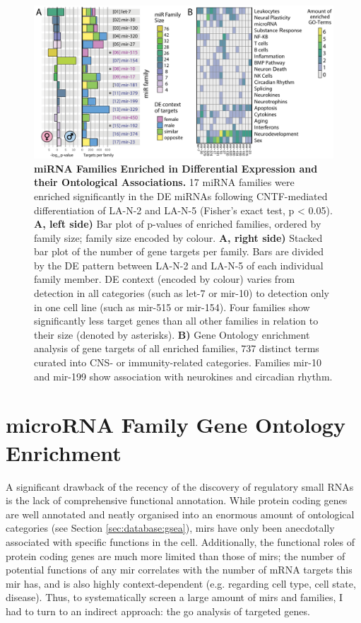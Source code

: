 \begin{figure}
\centering
\includegraphics[width=\textwidth]{figures/mir-de-fam-go}
\caption[Differential Expression miRNA Family Enrichment]{\textbf{miRNA Families Enriched in Differential Expression and their Ontological Associations.} 17 miRNA families were enriched significantly in the DE miRNAs following CNTF-mediated differentiation of LA-N-2 and LA-N-5 (Fisher's exact test, p < 0.05). \textbf{A, left side)} Bar plot of p-values of enriched families, ordered by family size; family size encoded by colour. \textbf{A, right side)} Stacked bar plot of the number of gene targets per family. Bars are divided by the DE pattern between LA-N-2 and LA-N-5 of each individual family member. DE context (encoded by colour) varies from detection in all categories (such as let-7 or mir-10) to detection only in one cell line (such as mir-515 or mir-154). Four families show significantly less target genes than all other families in relation to their size (denoted by asterisks). \textbf{B)} Gene Ontology enrichment analysis of gene targets of all enriched families, 737 distinct terms curated into CNS- or immunity-related categories. Families mir-10 and mir-199 show association with neurokines and circadian rhythm.
\label{fig:mir-de-fam-go}}
\end{figure}

\section{microRNA Family Gene Ontology Enrichment}
A significant drawback of the recency of the discovery of regulatory small RNAs is the lack of comprehensive functional annotation. While protein coding genes are well annotated and neatly organised into an enormous amount of ontological categories (see Section \ref{sec:database:gsea}), \acp{mir} have only been anecdotally associated with specific functions in the cell. Additionally, the functional roles of protein coding genes are much more limited than those of \acp{mir}; the number of potential functions of any \ac{mir} correlates with the number of mRNA targets this \ac{mir} has, and is also highly context-dependent (e.g. regarding cell type, cell state, disease). Thus, to systematically screen a large amount of \acp{mir} and families, I had to turn to an indirect approach: the \ac{go} analysis of targeted genes.

